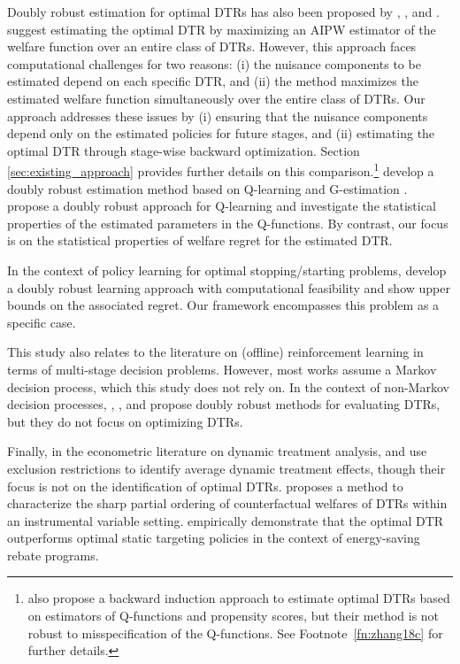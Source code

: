 Doubly robust estimation for optimal DTRs has also been proposed by \cite{Zhang_et_2013}, \cite{Wallace_Moodie_2015}, and \cite{Ertefaie_et_al_2021}. \cite{Zhang_et_2013} suggest estimating the optimal DTR by maximizing an AIPW estimator of the welfare function over an entire class of DTRs. However, this approach faces computational challenges for two reasons: (i) the nuisance components to be estimated depend on each specific DTR, and (ii) the method maximizes the estimated welfare function simultaneously over the entire class of DTRs. Our approach addresses these issues by (i) ensuring that the nuisance components depend only on the estimated policies for future stages, and (ii) estimating the optimal DTR through stage-wise backward optimization. Section \ref{sec:existing_approach} provides further details on this comparison.\footnote{\cite{zhang2018c} also propose a backward induction approach to estimate optimal DTRs based on estimators of Q-functions and propensity scores, but their method is not robust to misspecification of the Q-functions. See Footnote~\ref{fn:zhang18c} for further details.}
\cite{Wallace_Moodie_2015} develop a doubly robust estimation method based on Q-learning and G-estimation \citep{Robins_2004}. \cite{Ertefaie_et_al_2021} propose a doubly robust approach for Q-learning and investigate the statistical properties of the estimated parameters in the Q-functions. By contrast, our focus is on the statistical properties of welfare regret for the estimated DTR.

In the context of policy learning for optimal stopping/starting problems, \cite{Nie_et_al_2021} develop a doubly robust learning approach with computational feasibility and show upper bounds on the associated regret. Our framework encompasses this problem as a specific case.


This study also relates to the literature on (offline) reinforcement learning in terms of multi-stage decision problems. 
However, most works assume a Markov decision process, which this study does not rely on.
In the context of non-Markov decision processes, \cite{Jiang_Li_2016}, \cite{Thomas_et_al_2016}, and \cite{Kallus_Uehara_2020} propose doubly robust methods for evaluating DTRs, but they do not focus on optimizing DTRs.

Finally, in the econometric literature on dynamic treatment analysis, \cite{Heckman_Navarro_2007} and \cite{Heckman_et_al_2016} use exclusion restrictions to identify average dynamic treatment effects, though their focus is not on the identification of optimal DTRs. \cite{Han_2023} proposes a method to characterize the sharp partial ordering of counterfactual welfares of DTRs within an instrumental variable setting. \cite{Ida_et_al_2024} empirically demonstrate that the optimal DTR outperforms optimal static targeting policies in the context of energy-saving rebate programs.


